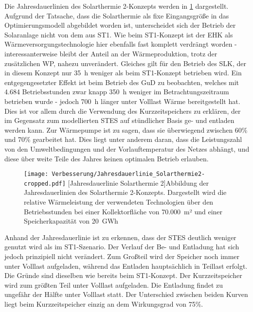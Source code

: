Die Jahresdauerlinien des Solarthermie 2-Konzepts werden in \ref{figure: Jahresdauerlinie_Solarthermie2} dargestellt. Aufgrund der Tatsache, dass die Solarthermie als fixe Eingangsgröße in das Optimierungsmodell abgebildet worden ist, unterscheidet sich der Betrieb der Solaranlage nicht von dem aus ST1. Wie beim ST1-Konzept ist der \ac{EHK} als Wärmeversorgungstechnologie hier ebenfalls fast komplett verdrängt worden - interessanterweise bleibt der Anteil an der Wärmeproduktion, trotz der zusätzlichen \acl{WP}, nahezu unverändert. Gleiches gilt für den Betrieb des \ac{SLK}, der in diesem Konzept nur 35~h weniger als beim ST1-Konzept betrieben wird. Ein entgegengesetzter Effekt ist beim Betrieb des \ac{GuD} zu beobachten, welches mit 4.684 Betriebsstunden zwar knapp 350~h weniger im Betrachtungszeitraum betrieben wurde - jedoch 700~h länger unter Volllast Wärme bereitgestellt hat. Dies ist vor allem durch die Verwendung des Kurzzeitspeichers zu erklären, der im Gegensatz zum modellierten \ac{STES} auf stündlicher Basis ge- und entladen werden kann. Zur Wärmepumpe ist zu sagen, dass sie überwiegend zwischen 60\% und 70\% gearbeitet hat. Dies liegt unter anderem daran, dass die Leistungszahl von den Umweltbedingungen und der Vorlauftemperatur des Netzes abhängt, und diese über weite Teile des Jahres keinen optimalen Betrieb erlauben.
	\begin{figure}[ht]
		\centering
		\texttt{[image: Verbesserung/Jahresdauerlinie\_Solarthermie2-cropped.pdf]}
		[Jahresdauerlinie Solarthermie 2]{Abbildung der Jahresdauerlinien des Solarthermie 2-Konzepts. Dargestellt wird die relative Wärmeleistung der verwendeten Technologien über den Betriebsstunden bei einer Kollektorfläche von 70.000~m² und einer Speicherkapazität von 20~GWh}
		\label{figure: Jahresdauerlinie_Solarthermie2}
	\end{figure}

Anhand der Jahresdauerlinie ist zu erkennen, dass der \ac{STES} deutlich weniger genutzt wird als im ST1-Szenario. Der Verlauf der Be- und Entladung hat sich jedoch prinzipiell nicht verändert. Zum Großteil wird der Speicher noch immer unter Volllast aufgeladen, während das Entladen hauptsächlich in Teillast erfolgt. Die Gründe sind dieselben wie bereits beim ST1-Konzept. Der Kurzzeitspeicher wird zum größten Teil unter Volllast aufgeladen. Die Entladung findet zu ungefähr der Hälfte unter Volllast statt. Der Unterschied zwischen beiden Kurven liegt beim Kurzzeitspeicher einzig an dem Wirkungsgrad von 75\%. 

